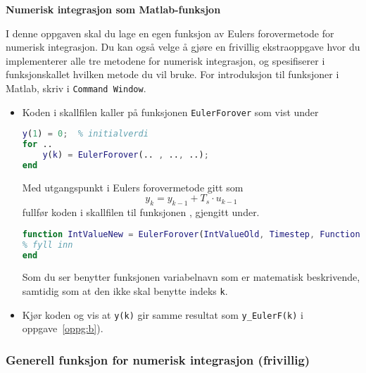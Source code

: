 \item
{\bf Numerisk integrasjon som Matlab-funksjon}
\label{oppg:d}

I denne oppgaven skal du lage en egen funksjon av
Eulers forovermetode for numerisk integrasjon.
Du kan også velge å gjøre en frivillig ekstraoppgave hvor du
implementerer alle tre metodene for numerisk integrasjon, og spesifiserer i
funksjonskallet  hvilken metode du vil bruke.
For introduksjon til
funksjoner i Matlab, skriv {\color{red}} i {\tt Command Window}. 



  \begin{itemize}
  \item  Koden i skallfilen kaller på
    funksjonen {\tt EulerForover} som vist under
\begin{lstlisting}[caption={Kodeutdrag som kaller på funksjonen {\tt EulerForover}.},
language= Matlab, label=kode:funksjon_EF,
numbers=none]
y(1) = 0;  % initialverdi
for ..
    y(k) = EulerForover(.. , .., ..);
end
\end{lstlisting}

Med utgangspunkt i Eulers forovermetode gitt som
\begin{equation}
  \label{eq:1aa}
  y_{k}  =  y_{k-1} +  T_s {\cdot} u_{k-1}
\end{equation}
fullfør koden i skallfilen til funksjonen  
, gjengitt under.

\begin{lstlisting}[caption={Funksjonen/filen {\tt EulerForover.m}.},
language= Matlab, label=kode:funksjon_EF2,
numbers=none]
function IntValueNew = EulerForover(IntValueOld, Timestep, FunctionValue)
% fyll inn
end
\end{lstlisting}

    Som du ser benytter funksjonen variabelnavn som er matematisk  
    beskrivende, samtidig som at den ikke skal benytte indeks
    {\tt k}.

    \item Kjør koden  og vis at {\tt y(k)} gir samme resultat som 
    {\tt  y\_EulerF(k)} i oppgave~\ref{oppg:b}).
\end{itemize}


    

\newpage
\subsubsection*{Generell funksjon for numerisk integrasjon (frivillig)}

